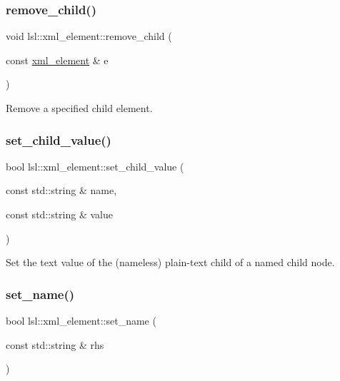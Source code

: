 \subsubsection{\texorpdfstring{remove\+\_\+child()}{remove\_child()}\hspace{0.1cm}{\footnotesize\ttfamily [2/2]}}
{\footnotesize\ttfamily void lsl\+::xml\+\_\+element\+::remove\+\_\+child (\begin{DoxyParamCaption}\item[{const \hyperlink{classlsl_1_1xml__element}{xml\+\_\+element} \&}]{e }\end{DoxyParamCaption})\hspace{0.3cm}{\ttfamily [inline]}}



Remove a specified child element. 

\mbox{\label{classlsl_1_1xml__element_a6fe187e03b36cf8fd5f9d3892e99453f}} 
\subsubsection{\texorpdfstring{set\+\_\+child\+\_\+value()}{set\_child\_value()}}
{\footnotesize\ttfamily bool lsl\+::xml\+\_\+element\+::set\+\_\+child\+\_\+value (\begin{DoxyParamCaption}\item[{const std\+::string \&}]{name,  }\item[{const std\+::string \&}]{value }\end{DoxyParamCaption})\hspace{0.3cm}{\ttfamily [inline]}}

Set the text value of the (nameless) plain-\/text child of a named child node. \mbox{\label{classlsl_1_1xml__element_a8ddf2b35719b273dbb5700f16a2da4e5}} 
\subsubsection{\texorpdfstring{set\+\_\+name()}{set\_name()}}
{\footnotesize\ttfamily bool lsl\+::xml\+\_\+element\+::set\+\_\+name (\begin{DoxyParamCaption}\item[{const std\+::string \&}]{rhs }\end{DoxyParamCaption})\hspace{0.3cm}{\ttfamily [inline]}}

